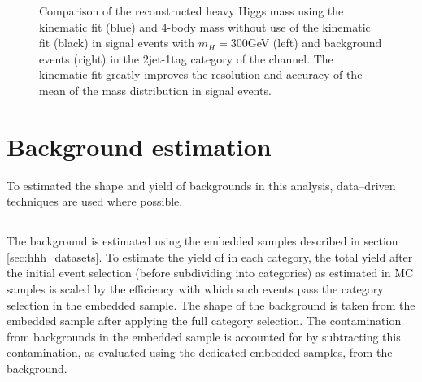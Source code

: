 \begin{figure}[h!]
\begin{center}
\end{center}
\caption{Comparison of the reconstructed heavy Higgs mass using the kinematic fit (blue) and
4-body mass without use of the kinematic fit (black) in signal events with $m_{H} = 300 $GeV (left) and \ttbar background events (right) in 
the 2jet-1tag category of the \mutau channel. The kinematic fit greatly improves the resolution and 
accuracy of the mean of the mass distribution in signal events. \cite{HIG-14-034-additional}}%
\label{fig:kinfitvsmjj}
\end{figure}


\section{Background estimation}
\label{sec:hhh_backgrounds}
To estimated the shape and yield of backgrounds in this analysis, data--driven techniques are
used where possible. 

\subsection{\texorpdfstring{\Ztautau}{Z to tau tau}}
\label{sec:hhh_backgrounds_ztt}
The \Ztautau background is estimated using the embedded samples
described in section \ref{sec:hhh_datasets}. To estimate the 
yield of \Ztautau in each category, the total
yield after the initial event selection (before subdividing into categories) as
estimated in \Ztautau \ac{MC} samples is scaled by the efficiency with which 
such events pass the category selection in the embedded sample. The shape of
the \Ztautau background is taken from the embedded sample after applying the full
category selection. The contamination from \ttbar backgrounds in the embedded
sample is accounted for by subtracting this contamination, as evaluated using
the dedicated \ttbar embedded samples, from the \Ztautau background.

